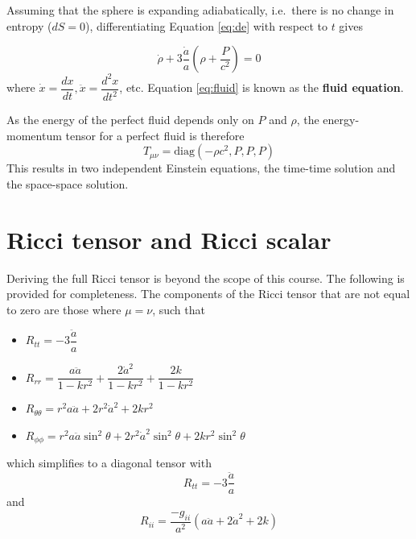 \documentclass[11pt,a4paper]{book}
\begin{document}
Assuming that the sphere is expanding adiabatically, i.e.~there is no
change in entropy (\(dS = 0\)), differentiating
Equation \eqref{eq:de}
with respect to \(t\) gives

\begin{equation}
    \dot{\rho} + 3\dfrac{\dot{a}}{a}\left(\rho + \dfrac{P}{c^2}\right) = 0
\label{eq:fluid}
\end{equation}
where \(\dot{x} = \dfrac{dx}{dt}, \ddot{x} = \dfrac{d^2x}{dt^2}\), etc. Equation \eqref{eq:fluid} is known as the \textbf{fluid equation}.

As the energy of the perfect fluid depends only on \(P\) and \(\rho\), the
energy-momentum tensor for a perfect fluid is therefore
\begin{equation}
T_{\mu\nu} = \text{diag}\left(-\rho c^2, P, P, P\right)
\label{eq:per-fluid}
\end{equation}
This results
in two independent Einstein equations, the time-time solution and the
space-space solution.

\hypertarget{sec:ricci}{%
\section{Ricci tensor and Ricci scalar}\label{sec:ricci}}

Deriving the full Ricci tensor is beyond the scope of this course. The
following is provided for completeness. The components of the Ricci
tensor that are not equal to zero are those where \(\mu = \nu\), such that

\begin{itemize}
\item
  \(R_{tt} = -3\dfrac{\ddot{a}}{a}\)
\item
  \(R_{rr} = \dfrac{a\ddot{a}}{1 - kr^2} + \dfrac{2\dot{a}^2}{1 - kr^2} + \dfrac{2k}{1-kr^2}\)
\item
  \(R_{\theta\theta} = r^2a\ddot{a} + 2r^2\dot{a}^2 + 2kr^2\)
\item
  \(R_{\phi\phi} = r^2 a\ddot{a}\sin^2\theta + 2r^2\dot{a}^2\sin^2\theta + 2kr^2 \sin^2\theta\)
\end{itemize}

which simplifies to a diagonal tensor with
\begin{equation}
R_{tt}= -3\dfrac{\ddot{a}}{a}
\label{eq:ric-tt}
\end{equation}
and
\begin{equation}
R_{ii} = \dfrac{-g_{ii}}{a^2}\left(a\ddot{a} + 2\dot{a}^2 + 2k\right)
\label{eq:ric-ii}
\end{equation}
\end{document}
